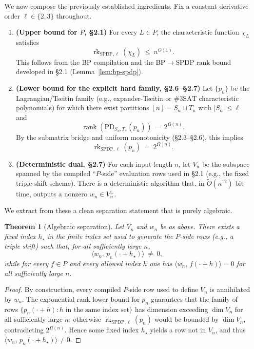 \documentclass[12pt]{article}
\newtheorem{theorem}{Theorem}
\theoremstyle{definition}
\theoremstyle{definition}
\theoremstyle{remark}
\theoremstyle{remark}
\begin{document}
We now compose the previously established ingredients. Fix a constant derivative order $\ell\in\{2,3\}$ throughout.

\begin{enumerate}
\item \textbf{(Upper bound for $P$, \S2.1)} For every $L\in P$, the characteristic function $\chi_L$ satisfies
\[
\operatorname{rk}_{\mathrm{SPDP},\ell}(\chi_L) \ \le\ n^{O(1)}.
\]
This follows from the BP compilation and the BP$\to$SPDP rank bound developed in \S2.1 (Lemma~\ref{lem:bp-spdp}).

\item \textbf{(Lower bound for the explicit hard family, \S2.6--\S2.7)} Let $\{p_n\}$ be the Lagrangian/Tseitin family (e.g., expander-Tseitin or $\#3\mathrm{SAT}$ characteristic polynomials) for which there exist partitions $[n]=S_n\sqcup T_n$ with $|S_n|\le\ell$ and
\[
\operatorname{rank}(\mathrm{PD}_{S_n,T_n}(p_n)) \ =\ 2^{\Omega(n)}.
\]
By the submatrix bridge and uniform monotonicity (\S2.3--\S2.6), this implies
\[
\operatorname{rk}_{\mathrm{SPDP},\ell}(p_n) \ =\ 2^{\Omega(n)}.
\]

\item \textbf{(Deterministic dual, \S2.7)} For each input length $n$, let $V_n$ be the subspace spanned by the compiled ``$P$-side'' evaluation rows used in \S2.1 (e.g., the fixed triple-shift scheme). There is a deterministic algorithm that, in $\tilde O(n^{12})$ bit time, outputs a nonzero $w_n\in V_n^{\perp}$.
\end{enumerate}

We extract from these a clean separation statement that is purely algebraic.

\begin{theorem}[Algebraic separation]\label{thm:algebraic-separation}
Let $V_n$ and $w_n$ be as above. There exists a fixed index $h_\star$ in the finite index set used to generate the $P$-side rows (e.g., a triple shift) such that, for all sufficiently large $n$,
\[
\langle w_n,\, p_n(\cdot+h_\star)\rangle \ \neq\ 0,
\]
while for every $f\in P$ and every allowed index $h$ one has $\langle w_n,\, f(\cdot+h)\rangle=0$ for all sufficiently large $n$.
\end{theorem}

\begin{proof}
By construction, every compiled $P$-side row used to define $V_n$ is annihilated by $w_n$. The exponential rank lower bound for $p_n$ guarantees that the family of rows $\{p_n(\cdot+h): h\text{ in the same index set}\}$ has dimension exceeding $\dim V_n$ for all sufficiently large $n$; otherwise $\operatorname{rk}_{\mathrm{SPDP},\ell}(p_n)$ would be bounded by $\dim V_n$, contradicting $2^{\Omega(n)}$. Hence some fixed index $h_\star$ yields a row not in $V_n$, and thus $\langle w_n,\, p_n(\cdot+h_\star)\rangle\neq 0$.
\end{proof}
\end{document}
